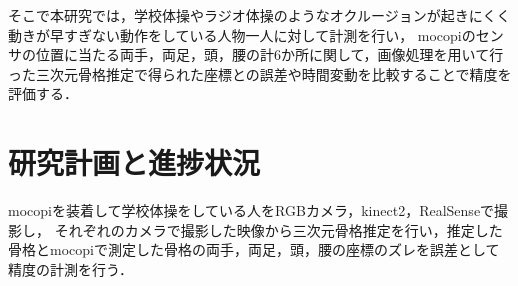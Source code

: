 \documentclass[titlepage]{jarticle}
\begin{document}


そこで本研究では，学校体操やラジオ体操のようなオクルージョンが起きにくく動きが早すぎない動作をしている人物一人に対して計測を行い，
mocopiのセンサの位置に当たる両手，両足，頭，腰の計6か所に関して，画像処理を用いて行った三次元骨格推定で得られた座標との誤差や時間変動を比較することで精度を評価する．
%
%
%

%
%
%
%
%

%
%
%
%
\section{研究計画と進捗状況}
%

%
%
%
mocopiを装着して学校体操をしている人をRGBカメラ，kinect2，RealSenseで撮影し，
それぞれのカメラで撮影した映像から三次元骨格推定を行い，推定した骨格とmocopiで測定した骨格の両手，両足，頭，腰の座標のズレを誤差として精度の計測を行う．
\end{document}
